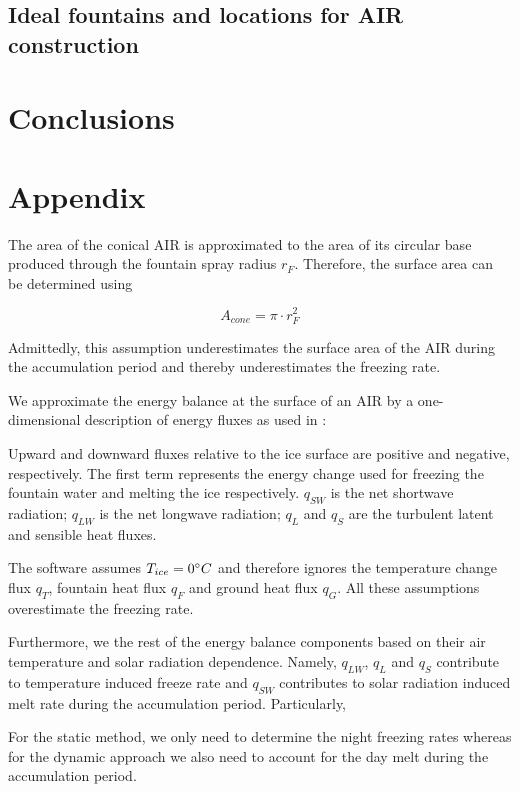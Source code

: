 \documentclass[utf8]{frontiersSCNS}
\begin{document}
\subsection{Ideal fountains and locations for AIR construction}

\section{Conclusions}


\section{Appendix}

The area of the conical AIR is approximated to the area of its circular base produced through the fountain spray
radius $r_F$. Therefore, the surface area can be determined using

\begin{equation} A_{cone} =\pi \cdot r_{F}^2 \label{eq:Area} \end{equation}

Admittedly, this assumption underestimates the surface area of the AIR during the accumulation period and
thereby underestimates the freezing rate.

We approximate the energy balance at the surface of an AIR by a one-dimensional description of energy fluxes as
used in \cite{Balasubramanian_2022}:


Upward and downward fluxes relative to the ice surface are positive and negative, respectively. The first
term represents the energy change used for freezing the fountain water and melting the ice respectively.
$q_{SW}$ is the net shortwave radiation; $q_{LW}$ is the net longwave radiation; $q_{L}$ and $q_{S}$ are the
turbulent latent and sensible heat fluxes. 

The software assumes $T_{ice} = 0 \degree C$ and therefore ignores the temperature change flux $q_{T}$, fountain
heat flux $q_{F}$ and ground heat flux $q_{G}$. All these assumptions overestimate the freezing rate.

Furthermore, we the rest of the energy balance components based on their air temperature and solar
radiation dependence. Namely, $q_{LW}$, $q_{L}$ and $q_{S}$ contribute to temperature induced freeze rate and
$q_{SW}$ contributes to solar radiation induced melt rate during the accumulation period.  Particularly,

For the static method, we only need to determine the night freezing rates whereas for the dynamic approach we
also need to account for the day melt during the accumulation period.
\end{document}
